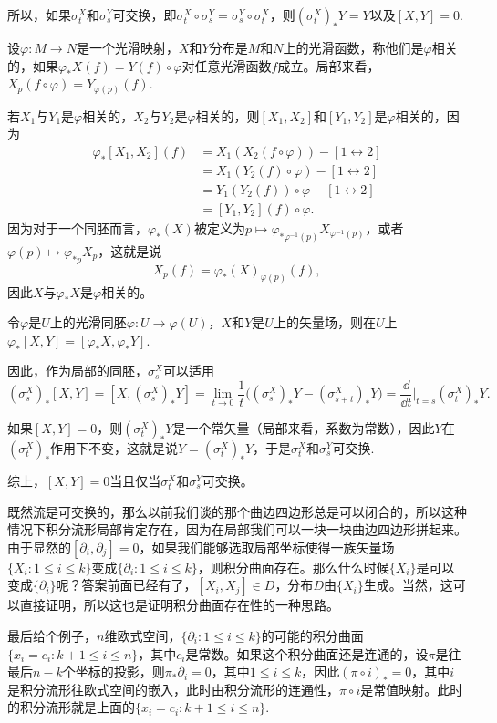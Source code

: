 所以，如果$\sigma_t^X$和$\sigma_s^Y$可交换，即$\sigma_t^X\circ \sigma_s^Y=\sigma_s^Y\circ \sigma_t^X$，则$(\sigma_t^X)_*Y=Y$以及$[X,Y]=0$.

\para 设$\varphi:M\to N$是一个光滑映射，$X$和$Y$分布是$M$和$N$上的光滑函数，称他们是$\varphi$相关的，如果$\varphi_*X(f)=Y(f)\circ \varphi$对任意光滑函数$f$成立。局部来看，$X_p(f\circ \varphi)=Y_{\varphi(p)}(f)$.

若$X_1$与$Y_1$是$\varphi$相关的，$X_2$与$Y_2$是$\varphi$相关的，则$[X_1,X_2]$和$[Y_1,Y_2]$是$\varphi$相关的，因为
\begin{align*}
	\varphi_*[X_1,X_2](f)&=X_1(X_2(f\circ \varphi))-[1\leftrightarrow 2]\\
	&=X_1(Y_2(f)\circ\varphi)-[1\leftrightarrow 2]\\
	&=Y_1(Y_2(f))\circ \varphi-[1\leftrightarrow 2]\\
	&=[Y_1,Y_2](f)\circ \varphi.
\end{align*}
因为对于一个同胚而言，$\varphi_*(X)$被定义为$p\mapsto \varphi_{*\varphi^{-1}(p)}X_{\varphi^{-1}(p)}$，或者$\varphi(p)\mapsto \varphi_{*p}X_p$，这就是说
\[
	X_p(f)=\varphi_*(X)_{\varphi(p)}(f),
\]
因此$X$与$\varphi_*X$是$\varphi$相关的。


\para 令$\varphi$是$U$上的光滑同胚$\varphi:U\to \varphi(U)$，$X$和$Y$是$U$上的矢量场，则在$U$上$\varphi_{*}[X,Y]=[\varphi_{*}X,\varphi_{*}Y]$.

因此，作为局部的同胚，$\sigma_s^X$可以适用
\[
	(\sigma_s^X)_*[X,Y]=[X,(\sigma_s^X)_*Y]=\lim_{t\to 0}\frac{1}{t}\bigl((\sigma_s^X)_*Y-(\sigma_{s+t}^X)_*Y\bigr)=\frac{\dd}{\dd t}\biggr|_{t=s}(\sigma_t^X)_*Y.
\]

如果$[X,Y]=0$，则$(\sigma_t^X)_*Y$是一个常矢量（局部来看，系数为常数），因此$Y$在$(\sigma_t^X)_*$作用下不变，这就是说$Y=(\sigma_t^X)_*Y$，于是$\sigma_t^X$和$\sigma_s^Y$可交换.

综上，$[X,Y]=0$当且仅当$\sigma_t^X$和$\sigma_s^Y$可交换。

\para 既然流是可交换的，那么以前我们谈的那个曲边四边形总是可以闭合的，所以这种情况下积分流形局部肯定存在，因为在局部我们可以一块一块曲边四边形拼起来。由于显然的$[\partial_i,\partial_j]=0$，如果我们能够选取局部坐标使得一族矢量场$\{X_i:1\leq i \leq k\}$变成$\{\partial_i:1\leq i \leq k\}$，则积分曲面存在。那么什么时候$\{X_i\}$是可以变成$\{\partial_i\}$呢？答案前面已经有了，$[X_i,X_j]\in D$，分布$D$由$\{X_i\}$生成。当然，这可以直接证明，所以这也是证明积分曲面存在性的一种思路。

最后给个例子，$n$维欧式空间，$\{\partial_i:1\leq i \leq k\}$的可能的积分曲面$\{x_i=c_i:k+1\leq i \leq n\}$，其中$c_i$是常数。如果这个积分曲面还是连通的，设$\pi$是往最后$n-k$个坐标的投影，则$\pi_*\partial_i=0$，其中$1\leq i \leq k$，因此$(\pi\circ i)_*=0$，其中$i$是积分流形往欧式空间的嵌入，此时由积分流形的连通性，$\pi\circ i$是常值映射。此时的积分流形就是上面的$\{x_i=c_i:k+1\leq i \leq n\}$.

